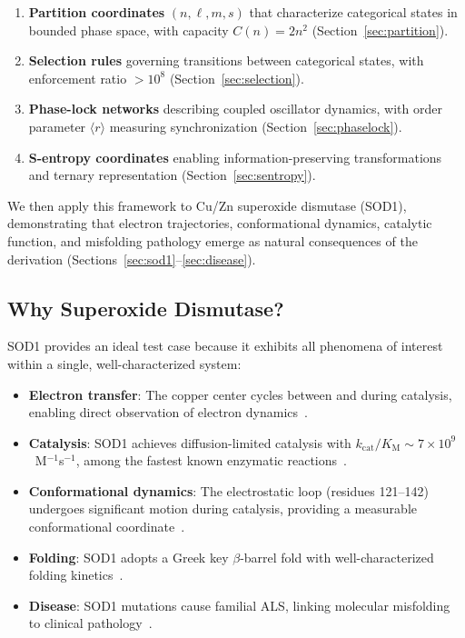 \documentclass[twocolumn,aps,prx,superscriptaddress,longbibliography]{revtex4-2}
\theoremstyle{remark}
\newcommand{\kcat}{k_\text{cat}}
\newcommand{\Km}{K_\text{M}}
\newcommand{\orderpar}{\langle r \rangle}
\begin{document}
\begin{enumerate}
    \item \textbf{Partition coordinates} $(n, \ell, m, s)$ that characterize
    categorical states in bounded phase space, with capacity $C(n) = 2n^2$
    (Section~\ref{sec:partition}).

    \item \textbf{Selection rules} governing transitions between categorical
    states, with enforcement ratio $>10^8$ (Section~\ref{sec:selection}).

    \item \textbf{Phase-lock networks} describing coupled oscillator dynamics,
    with order parameter $\orderpar$ measuring synchronization
    (Section~\ref{sec:phaselock}).

    \item \textbf{S-entropy coordinates} enabling information-preserving
    transformations and ternary representation (Section~\ref{sec:sentropy}).
\end{enumerate}

We then apply this framework to Cu/Zn superoxide dismutase (SOD1),
demonstrating that electron trajectories, conformational dynamics, catalytic
function, and misfolding pathology emerge as natural consequences of the
derivation (Sections~\ref{sec:sod1}--\ref{sec:disease}).

\subsection{Why Superoxide Dismutase?}

SOD1 provides an ideal test case because it exhibits all phenomena of interest
within a single, well-characterized system:

\begin{itemize}
    \item \textbf{Electron transfer}: The copper center cycles between
     and  during catalysis, enabling direct observation
    of electron dynamics~\cite{Tainer1983}.

    \item \textbf{Catalysis}: SOD1 achieves diffusion-limited catalysis with
    $\kcat/\Km \sim 7 \times 10^9$~M$^{-1}$s$^{-1}$, among the fastest known
    enzymatic reactions~\cite{Klug1972}.

    \item \textbf{Conformational dynamics}: The electrostatic loop (residues
    121--142) undergoes significant motion during catalysis, providing a
    measurable conformational coordinate~\cite{Strange2003}.

    \item \textbf{Folding}: SOD1 adopts a Greek key $\beta$-barrel fold with
    well-characterized folding kinetics~\cite{Lindberg2004}.

    \item \textbf{Disease}: SOD1 mutations cause familial ALS, linking
    molecular misfolding to clinical pathology~\cite{Rosen1993}.
\end{itemize}
\end{document}
